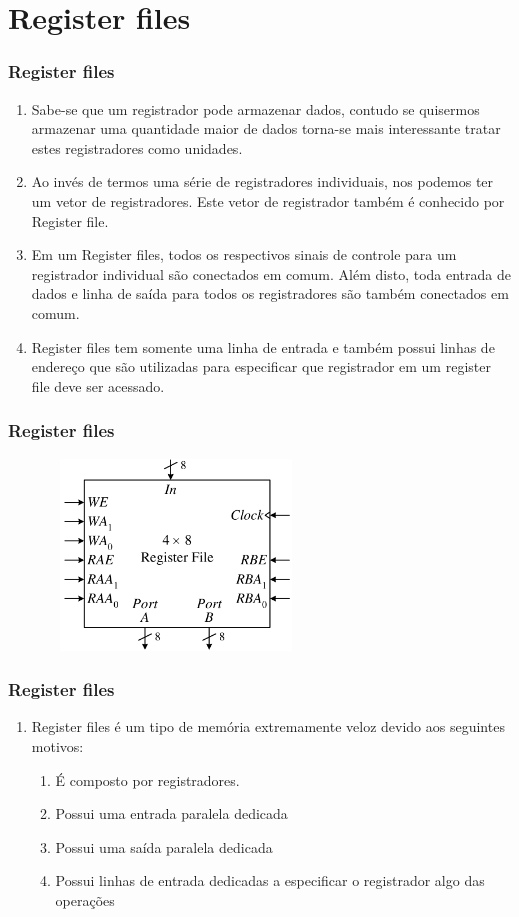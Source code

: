 \documentclass{beamer}
\begin{document}
\section{Register files}
\begin{frame}
 \frametitle{Register files}
\begin{enumerate}
  \item Sabe-se que um registrador pode armazenar dados, contudo se quisermos armazenar uma quantidade maior de dados torna-se mais interessante 
	tratar estes registradores como unidades. \pause
  \item Ao invés de termos uma série de registradores individuais, nos podemos ter um vetor de registradores. Este vetor de registrador também é 
	conhecido por Register file.\pause
  \item Em um Register files, todos os respectivos sinais de controle para um registrador individual são conectados em comum. Além disto, toda 
	entrada de dados e linha de saída para todos os registradores são também conectados em comum. \pause
  \item Register files tem somente uma linha de entrada e também possui linhas de endereço que são utilizadas para especificar que registrador em 
	um register file deve ser acessado. 
 \end{enumerate}
\end{frame}

\begin{frame}
 \frametitle{Register files}
 \includegraphics[height=2in, width=3.5in]{register_files.png}
\end{frame}

\begin{frame}
 \frametitle{Register files}
 \begin{enumerate}
  \item Register files é um tipo de memória extremamente veloz devido aos seguintes motivos: \pause
    \begin{enumerate}
      \item É composto por registradores.\pause
      \item Possui uma entrada paralela dedicada \pause
      \item Possui uma saída paralela dedicada \pause
      \item Possui linhas de entrada dedicadas a especificar o registrador algo das operações
    \end{enumerate}
 \end{enumerate}
\end{frame}
\end{document}
